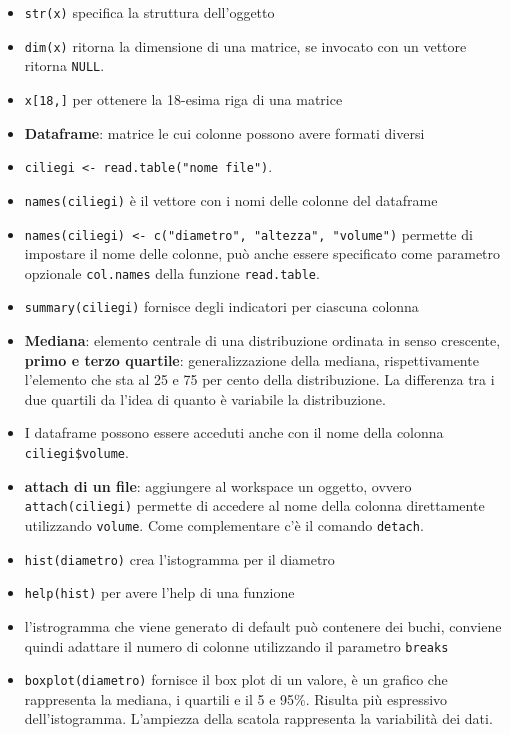 \begin{itemize}
\item
  \texttt{str(x)} specifica la struttura dell'oggetto
\item
  \texttt{dim(x)} ritorna la dimensione di una matrice, se invocato con
  un vettore ritorna \texttt{NULL}.
\item
  \texttt{x{[}18,{]}} per ottenere la 18-esima riga di una matrice
\item
  \textbf{Dataframe}: matrice le cui colonne possono avere formati
  diversi
\item
  \texttt{ciliegi\ \textless{}-\ read.table("nome\ file")}.
\item
  \texttt{names(ciliegi)} è il vettore con i nomi delle colonne del
  dataframe
\item
  \texttt{names(ciliegi)\ \textless{}-\ c("diametro",\ "altezza",\ "volume")}
  permette di impostare il nome delle colonne, può anche essere
  specificato come parametro opzionale \texttt{col.names} della
  funzione \texttt{read.table}.
\item
  \texttt{summary(ciliegi)} fornisce degli indicatori per ciascuna
  colonna
\item
  \textbf{Mediana}: elemento centrale di una distribuzione ordinata in
  senso crescente, \textbf{primo e terzo quartile}: generalizzazione
  della mediana, rispettivamente l'elemento che sta al 25 e 75 per cento
  della distribuzione. La differenza tra i due quartili da l'idea di
  quanto è variabile la distribuzione.
\item
  I dataframe possono essere acceduti anche con il nome della colonna
  \texttt{ciliegi\$volume}.
\item
  \textbf{attach di un file}: aggiungere al workspace un oggetto, ovvero
  \texttt{attach(ciliegi)} permette di accedere al nome della colonna
  direttamente utilizzando \texttt{volume}. Come complementare c'è il
  comando \texttt{detach}.
\item
  \texttt{hist(diametro)} crea l'istogramma per il diametro
\item
  \texttt{help(hist)} per avere l'help di una funzione
\item
  l'istrogramma che viene generato di default può contenere dei buchi,
  conviene quindi adattare il numero di colonne utilizzando il parametro
  \texttt{breaks}
\item
  \texttt{boxplot(diametro)} fornisce il box plot di un valore, è un
  grafico che rappresenta la mediana, i quartili e il 5 e 95\%. Risulta
  più espressivo dell'istogramma. L'ampiezza della scatola rappresenta
  la variabilità dei dati.

\end{itemize}
